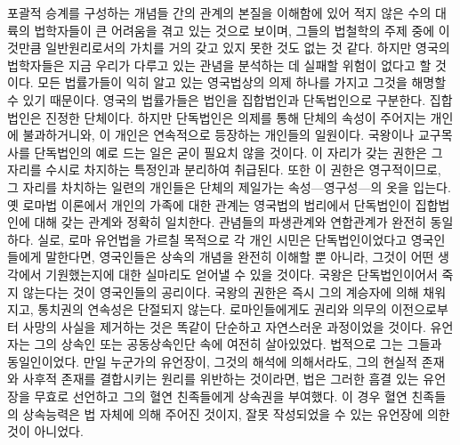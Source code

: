 포괄적 승계를 구성하는 개념들 간의 관계의 본질을 이해함에 있어
적지 않은 수의 대륙의 법학자들이
큰 어려움을 겪고 있는 것으로 보이며,
그들의 법철학의 주제 중에 이것만큼
일반원리로서의 가치를 거의 갖고 있지 못한 것도 없는 것 같다.
하지만 영국의 법학자들은 지금 우리가 다루고 있는 관념을 분석하는 데
실패할 위험이 없다고 할 것이다.
모든 법률가들이 익히 알고 있는 영국법상의 의제 하나를 가지고
그것을 해명할 수 있기 때문이다.
영국의 법률가들은 법인을 집합법인과
단독법인으로 구분한다.
집합법인은 진정한 단체이다.
하지만 단독법인은 의제를 통해 단체의 속성이
주어지는 개인에 불과하거니와,
이 개인은 연속적으로 등장하는 개인들의 일원이다.
국왕이나 교구목사를
단독법인의 예로 드는 일은 굳이 필요치 않을 것이다.
이 자리가 갖는 권한은 그 자리를 수시로 차지하는 특정인과 분리하여 취급된다.
또한 이 권한은 영구적이므로, 그 자리를 차치하는 일련의 개인들은
단체의 제일가는 속성---영구성---의 옷을 입는다.
옛 로마법 이론에서 개인의 가족에 대한 관계는
영국법의 법리에서 단독법인이 집합법인에 대해 갖는 관계와 정확히 일치한다.
관념들의 파생관계와 연합관계가 완전히 동일하다.
실로, 로마 유언법을 가르칠 목적으로
각 개인 시민은 단독법인이었다고 영국인들에게 말한다면,
영국인들은 상속의 개념을 완전히 이해할 뿐 아니라,
그것이 어떤 생각에서 기원했는지에 대한 실마리도 얻어낼 수 있을 것이다.
국왕은 단독법인이어서 죽지 않는다는 것이 영국인들의 공리이다.
국왕의 권한은 즉시 그의 계승자에 의해 채워지고,
통치권의 연속성은 단절되지 않는다.
로마인들에게도
권리와 의무의 이전으로부터 사망의 사실을 제거하는 것은
똑같이 단순하고 자연스러운 과정이었을 것이다.
유언자는 그의 상속인 또는 공동상속인단 속에 여전히 살아있었다.
법적으로 그는 그들과 동일인이었다.
만일 누군가의 유언장이, 그것의 해석에 의해서라도,
그의 현실적 존재와 사후적 존재를 결합시키는 원리를
위반하는 것이라면,
법은 그러한 흠결 있는 유언장을 무효로 선언하고
그의 혈연 친족들에게 상속권을 부여했다.
이 경우 혈연 친족들의 상속능력은 법 자체에 의해 주어진 것이지,
잘못 작성되었을 수 있는 유언장에 의한 것이 아니었다.

